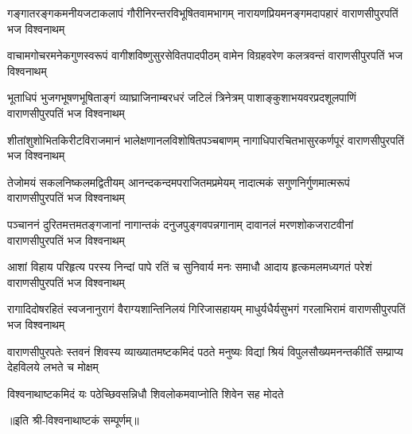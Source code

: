 

\fourlineindentedshloka
{गङ्गातरङ्गकमनीयजटाकलापं}
{गौरीनिरन्तरविभूषितवामभागम्}
{नारायणप्रियमनङ्गमदापहारं}
{वाराणसीपुरपतिं भज विश्वनाथम्} %

\fourlineindentedshloka
{वाचामगोचरमनेकगुणस्वरूपं}
{वागीशविष्णुसुरसेवितपादपीठम्}
{वामेन विग्रहवरेण कलत्रवन्तं}
{वाराणसीपुरपतिं भज विश्वनाथम्} %

\fourlineindentedshloka
{भूताधिपं भुजगभूषणभूषिताङ्गं}
{व्याघ्राजिनाम्बरधरं जटिलं त्रिनेत्रम्}
{पाशाङ्कुशाभयवरप्रदशूलपाणिं}
{वाराणसीपुरपतिं भज विश्वनाथम्} %

\fourlineindentedshloka
{शीतांशुशोभितकिरीटविराजमानं}
{भालेक्षणानलविशोषितपञ्चबाणम्}
{नागाधिपारचितभासुरकर्णपूरं}
{वाराणसीपुरपतिं भज विश्वनाथम्} %

\fourlineindentedshloka
{तेजोमयं सकलनिष्कलमद्वितीयम्}
{आनन्दकन्दमपराजितमप्रमेयम्}
{नादात्मकं सगुणनिर्गुणमात्मरूपं}
{वाराणसीपुरपतिं भज विश्वनाथम्} %

\fourlineindentedshloka
{पञ्चाननं दुरितमत्तमतङ्गजानां}
{नागान्तकं दनुजपुङ्गवपन्नगानाम्}
{दावानलं मरणशोकजराटवीनां}
{वाराणसीपुरपतिं भज विश्वनाथम्} %

\fourlineindentedshloka
{आशां विहाय परिहृत्य परस्य निन्दां}
{पापे रतिं च सुनिवार्य मनः समाधौ}
{आदाय हृत्कमलमध्यगतं परेशं}
{वाराणसीपुरपतिं भज विश्वनाथम्} %

\fourlineindentedshloka
{रागादिदोषरहितं स्वजनानुरागं}
{वैराग्यशान्तिनिलयं गिरिजासहायम्}
{माधुर्यधैर्यसुभगं गरलाभिरामं}
{वाराणसीपुरपतिं भज विश्वनाथम्} %

\fourlineindentedshloka
{वाराणसीपुरपतेः स्तवनं शिवस्य}
{व्याख्यातमष्टकमिदं पठते मनुष्यः}
{विद्यां श्रियं विपुलसौख्यमनन्तकीर्तिं}
{सम्प्राप्य देहविलये लभते च मोक्षम्} %

\twolineshloka
{विश्वनाथाष्टकमिदं यः पठेच्छिवसन्निधौ}
{शिवलोकमवाप्नोति शिवेन सह मोदते} %

{॥इति श्री-विश्वनाथाष्टकं सम्पूर्णम्॥}
